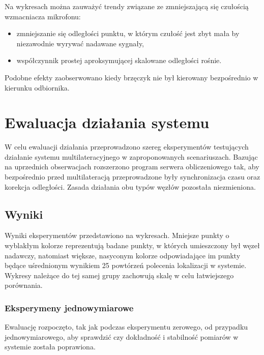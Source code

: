 Na wykresach można zauważyć trendy związane ze zmniejszającą się czułością wzmacniacza mikrofonu:

\begin{itemize}
    \item zmniejszanie się odległości punktu, w którym czułość jest zbyt mała by niezawodnie wyrywać nadawane sygnały,
    \item współczynnik prostej aproksymującej skalowane odległości rośnie.
\end{itemize}

Podobne efekty zaobserwowano kiedy brzęczyk nie był kierowany bezpośrednio w kierunku odbiornika.

\section{Ewaluacja działania systemu}

W celu ewaluacji działania przeprowadzono szereg eksperymentów testujących działanie systemu multilateracyjnego w zaproponowanych scenariuszach. Bazując na uprzednich obserwacjach rozszerzono program serwera obliczeniowego tak, aby bezpośrednio przed multilateracją przeprowadzone były synchronizacja czasu oraz korekcja odległości. Zasada działania obu typów węzłów pozostała niezmieniona.

\subsection{Wyniki}

Wyniki eksperymentów przedstawiono na wykresach. Mniejsze punkty o wyblakłym kolorze reprezentują badane punkty, w których umieszczony był węzeł nadawczy, natomiast większe, nasyconym kolorze odpowiadające im punkty będące uśrednionym wynikiem 25 powtórzeń polecenia lokalizacji w systemie. Wykresy należące do tej samej grupy zachowują skalę w celu łatwiejszego porównania.

\subsubsection{Eksperymeny jednowymiarowe}

Ewaluację rozpoczęto, tak jak podczas eksperymentu zerowego, od przypadku jednowymiarowego, aby sprawdzić czy dokładność i stabilność pomiarów w systemie została poprawiona.




